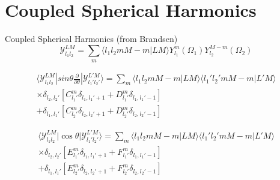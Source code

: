 \documentclass[a4paper,12pt]{paper}
\newcommand{\innerprod}[2]{\langle #1 | #2 \rangle}
\newcommand{\matelem}[3]{\langle #1 | #2 | #3 \rangle}
\newcommand{\cg}[6]{\innerprod{#1 #2 #3 #4}{#5 #6}}
\newcommand{\partialdiff}[2]{\frac{\partial #1}{\partial #2}}
\begin{document}
\section{Coupled Spherical Harmonics}
Coupled Spherical Harmonics (from Brandsen)
\begin{equation}
	\label{eqn:coupled-sph}
	\mathcal{Y}_{l_1 l_2}^{LM} = \sum_m \cg{l_1}{l_2}{m}{M-m}{L}{M}
Y_{l_1}^m(\Omega_1) Y_{l_2}^{M-m}(\Omega_2) 
\end{equation}

\begin{eqnarray}
  \matelem
	{\mathcal{Y}_{l_1 l_2}^{LM}}
	{sin \theta\partialdiff{}{\theta}}
	{\mathcal{Y}_{l_1' l_2'}^{L'M}} =
   \sum_m
	\cg{l_1}{l_2}{m}{M-m}{L}{M}
	\cg{l_1'}{l_2'}{m}{M-m}{L'}{M} \\
	\times \delta_{l_2, l_2'} \left[ 
		C_{l_1'}^m \delta_{l_1, l_1'+1} 
		+ D_{l_1'}^m \delta_{l_1, l_1'-1}  \right] \\
	+ \delta_{l_1, l_1'} \left[ 
		C_{l_2'}^m \delta_{l_2, l_2'+1} 
		+ D_{l_2'}^m \delta_{l_2, l_2'-1}  \right]
\end{eqnarray}

\begin{eqnarray}
  \matelem
	{\mathcal{Y}_{l_1 l_2}^{LM}}
	{\cos \theta}
	{\mathcal{Y}_{l_1' l_2'}^{L'M}} =
   \sum_m
	\cg{l_1}{l_2}{m}{M-m}{L}{M}
	\cg{l_1'}{l_2'}{m}{M-m}{L'}{M} \\
	\times \delta_{l_2, l_2'} \left[ 
		E_{l_1'}^m \delta_{l_1, l_1'+1} 
		+ F_{l_1'}^m \delta_{l_1, l_1'-1}  \right] \\
	+ \delta_{l_1, l_1'} \left[ 
		E_{l_2'}^m \delta_{l_2, l_2'+1} 
		+ F_{l_2'}^m \delta_{l_2, l_2'-1}  \right]
\end{eqnarray}
\end{document}
